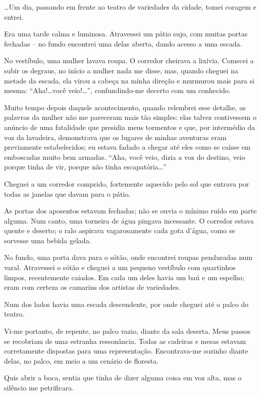\dots Um dia, passando em frente ao teatro de variedades da cidade, tomei coragem e entrei.

Era uma tarde calma e luminosa. Atravessei um pátio sujo, com muitas portas fechadas -- no fundo encontrei uma delas aberta, dando acesso a uma escada.

No vestíbulo, uma mulher lavava roupa. O corredor cheirava a lixívia. Comecei a subir os degraus, no início a mulher nada me disse, mas, quando cheguei na metade da escada, ela virou a cabeça na minha direção e murmurou mais para si mesma: ``Aha!\dots você veio!\dots'', confundindo-me decerto com um conhecido.

Muito tempo depois daquele acontecimento, quando relembrei esse detalhe, as palavras da mulher não me pareceram mais tão simples: elas talvez contivessem o anúncio de uma fatalidade que presidia meus tormentos e que, por intermédio da voz da lavadeira, demonstrava que os lugares de minhas aventuras eram previamente estabelecidos; eu estava fadado a chegar até eles como se caísse em emboscadas muito bem armadas. ``Aha, você veio, dizia a voz do destino, veio porque tinha de vir, porque não tinha escapatória…''

Cheguei a um corredor comprido, fortemente aquecido pelo sol que entrava por todas as janelas que davam para o pátio.

As portas dos aposentos estavam fechadas; não se ouvia o mínimo ruído em parte alguma. Num canto, uma torneira de água pingava incessante. O corredor estava quente e deserto; o ralo aspirava vagarosamente cada gota d’água, como se sorvesse uma bebida gelada. 

No fundo, uma porta dava para o sótão, onde encontrei roupas penduradas num varal. Atravessei o sótão e cheguei a um pequeno vestíbulo com quartinhos limpos, recentemente caiados. Em cada um deles havia um baú e um espelho; eram com certeza os camarins dos artistas de variedades.

Num dos lados havia uma escada descendente, por onde cheguei até o palco do teatro.

Vi-me portanto, de repente, no palco vazio, diante da sala deserta. Meus passos se recobriam de uma estranha ressonância. Todas as cadeiras e mesas estavam corretamente dispostas para uma representação. Encontrava-me sozinho diante delas, no palco, em meio a um cenário de floresta.

Quis abrir a boca, sentia que tinha de dizer alguma coisa em voz alta, mas o silêncio me petrificara.

